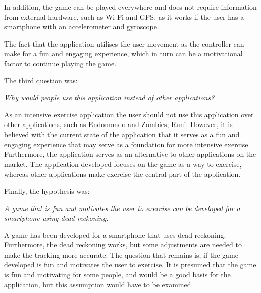 In addition, the game can be played everywhere and does not require information from external hardware, such as Wi-Fi and GPS, as it works if the user has a smartphone with an accelerometer and gyroscope.

The fact that the application utilises the user movement as the controller can make for a fun and engaging experience, which in turn can be a motivational factor to continue playing the game. 

The third question was:

\begin{center}
\textit{Why would people use this application instead of other applications?}
\end{center}

As an intensive exercise application the user should not use this application over other applications, such as Endomondo and Zombies, Run!.
However, it is believed with the current state of the application that it serves as a fun and engaging experience that may serve as a  foundation for more intensive exercise.
Furthermore, the application serves as an alternative to other applications on the market.
The application developed focuses on the game as a way to exercise, whereas other applications make exercise the central part of the application.


Finally, the hypothesis was:

\begin{center}
\textit{A game that is fun and motivates the user to exercise can be developed for a smartphone using dead reckoning.}
\end{center}

A game has been developed for a smartphone that uses dead reckoning.
Furthermore, the dead reckoning works, but some adjustments are needed to make the tracking more accurate.
The question that remains is, if the game developed is fun and motivates the user to exercise.
It is presumed that the game is fun and motivating for some people, and would be a good basis for the application, but this assumption would have to be examined. 